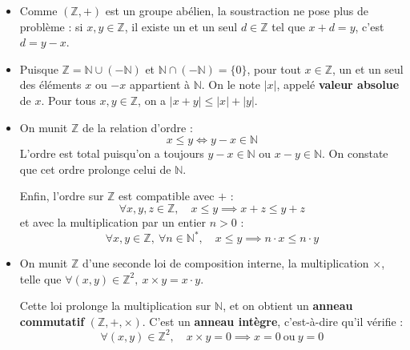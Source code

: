 \documentclass[a4paper,11pt]{article}
\newcommand{\N}{\mathbb{N}}
\newcommand{\Z}{\mathbb{Z}}
\newcommand{\mot}[1]{\textcolor{bordeaux}{\textbf{#1}}}
\begin{document}
\begin{exemples}[Construction de $(\Z, +)$]
\begin{center}
\end{center}

\begin{itemize}
    \item Comme $(\Z, +)$ est un groupe abélien, la soustraction ne pose plus de problème : si $x, y \in \Z$, il existe un et un seul $d \in \Z$ tel que $x + d = y$, c'est $d = y - x$.
    \item Puisque $\Z = \N \cup (-\N)$ et $\N \cap (-\N) = \{0\}$, pour tout $x \in \Z$, un et un seul des éléments $x$ ou $-x$ appartient à $\N$. On le note $|x|$, appelé \mot{valeur absolue} de $x$. Pour tous $x, y \in \Z$, on a $|x + y| \le |x| + |y|$.
    \item On munit $\Z$ de la relation d'ordre :
    \[
    x \le y \iff y - x \in \N
    \]
    L'ordre est total puisqu'on a toujours $y - x \in \N$ ou $x - y \in \N$. On constate que cet ordre prolonge celui de $\N$.
    
    Enfin, l'ordre sur $\Z$ est compatible avec $+$ :
    \[
    \forall x, y, z \in \Z, \quad x \le y \implies x + z \le y + z
    \]
    et avec la multiplication par un entier $n > 0$ :
    \[
    \forall x, y \in \Z, \ \forall n \in \N^*, \quad x \le y \implies n \cdot x \le n \cdot y
    \]
    \item On munit $\Z$ d'une seconde loi de composition interne, la multiplication $\times$, telle que $\forall (x, y) \in \Z^2, \ x \times y = x \cdot y$.
    
    Cette loi prolonge la multiplication sur $\N$, et on obtient un \mot{anneau commutatif} $(\Z, +, \times)$. C'est un \mot{anneau intègre}, c'est-à-dire qu'il vérifie :
    \[
    \forall (x, y) \in \Z^2, \quad x \times y = 0 \implies x = 0 \ \text{ou} \ y = 0
    \]
\end{itemize}
\end{exemples}
\end{document}
